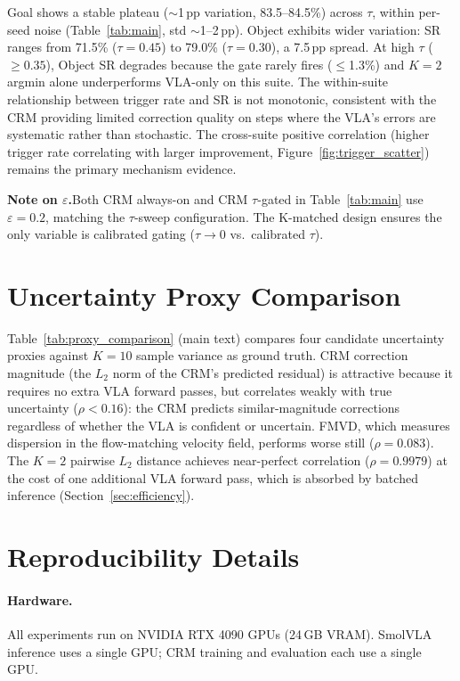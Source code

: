  Goal shows a stable plateau (${\sim}$1\,pp variation, 83.5--84.5\%) across $\tau$, within per-seed noise (Table~\ref{tab:main}, std ${\sim}$1--2\,pp). Object exhibits wider variation: SR ranges from 71.5\% ($\tau{=}0.45$) to 79.0\% ($\tau{=}0.30$), a 7.5\,pp spread. At high $\tau$ (${\geq}0.35$), Object SR degrades because the gate rarely fires (${\leq}$1.3\%) and $K{=}2$ argmin alone underperforms VLA-only on this suite. The within-suite relationship between trigger rate and SR is not monotonic, consistent with the CRM providing limited correction quality on steps where the VLA's errors are systematic rather than stochastic. The cross-suite positive correlation (higher trigger rate correlating with larger improvement, Figure~\ref{fig:trigger_scatter}) remains the primary mechanism evidence.

 \textbf{Note on $\varepsilon$.}\enspace Both CRM always-on and CRM $\tau$-gated in Table~\ref{tab:main} use $\varepsilon{=}0.2$, matching the $\tau$-sweep configuration. The K-matched design ensures the only variable is calibrated gating ($\tau{\to}0$ vs.\ calibrated $\tau$).


\section{Uncertainty Proxy Comparison}
\label{sec:proxy_comparison}

 Table~\ref{tab:proxy_comparison} (main text) compares four candidate uncertainty proxies against $K{=}10$ sample variance as ground truth. CRM correction magnitude (the $L_2$ norm of the CRM's predicted residual) is attractive because it requires no extra VLA forward passes, but correlates weakly with true uncertainty ($\rho < 0.16$): the CRM predicts similar-magnitude corrections regardless of whether the VLA is confident or uncertain. FMVD, which measures dispersion in the flow-matching velocity field, performs worse still ($\rho{=}0.083$). The $K{=}2$ pairwise $L_2$ distance achieves near-perfect correlation ($\rho{=}0.9979$) at the cost of one additional VLA forward pass, which is absorbed by batched inference (Section~\ref{sec:efficiency}).


\section{Reproducibility Details}
\label{sec:reproducibility}

\paragraph{Hardware.}
All experiments run on NVIDIA RTX 4090 GPUs (24\,GB VRAM). SmolVLA inference uses a single GPU; CRM training and evaluation each use a single GPU.

